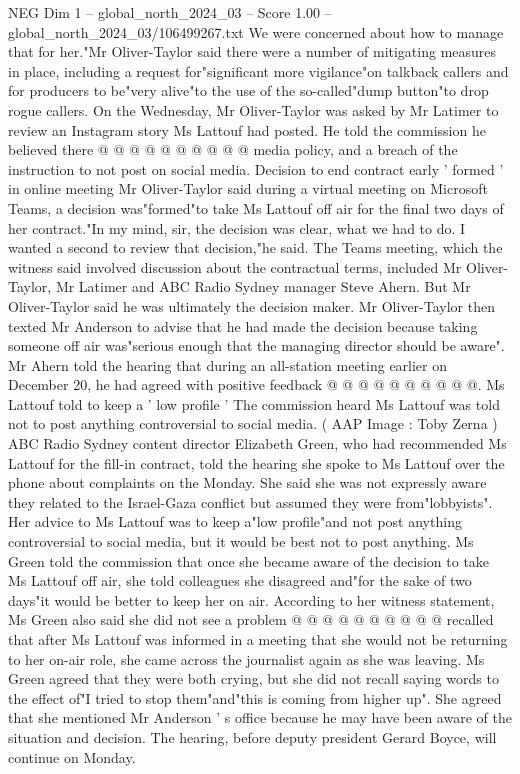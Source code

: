 \begin{textsample}{NEG Dim 1 – global\_north\_2024\_03 – Score 1.00 – global\_north\_2024\_03/106499267.txt}
We were concerned about how to manage that for her."Mr Oliver-Taylor said there were a number of mitigating measures in place, including a request for"significant more vigilance"on talkback callers and for producers to be"very alive"to the use of the so-called"dump button"to drop rogue callers.
On the Wednesday, Mr Oliver-Taylor was asked by Mr Latimer to review an Instagram story Ms Lattouf had posted.
He told the commission he believed there @ @ @ @ @ @ @ @ @ @ media policy, and a breach of the instruction to not post on social media.
Decision to end contract early ' formed ' in online meeting Mr Oliver-Taylor said during a virtual meeting on Microsoft Teams, a decision was"formed"to take Ms Lattouf off air for the final two days of her contract."In my mind, sir, the decision was clear, what we had to do.
I wanted a second to review that decision,"he said.
The Teams meeting, which the witness said involved discussion about the contractual terms, included Mr Oliver-Taylor, Mr Latimer and ABC Radio Sydney manager Steve Ahern.
But Mr Oliver-Taylor said he was ultimately the decision maker.
Mr Oliver-Taylor then texted Mr Anderson to advise that he had made the decision because taking someone off air was"serious enough that the managing director should be aware".
Mr Ahern told the hearing that during an all-station meeting earlier on December 20, he had agreed with positive feedback @ @ @ @ @ @ @ @ @ @.
Ms Lattouf told to keep a ' low profile ' The commission heard Ms Lattouf was told not to post anything controversial to social media. ( AAP Image : Toby Zerna ) ABC Radio Sydney content director Elizabeth Green, who had recommended Ms Lattouf for the fill-in contract, told the hearing she spoke to Ms Lattouf over the phone about complaints on the Monday.
She said she was not expressly aware they related to the Israel-Gaza conflict but assumed they were from"lobbyists".
Her advice to Ms Lattouf was to keep a"low profile"and not post anything controversial to social media, but it would be best not to post anything.
Ms Green told the commission that once she became aware of the decision to take Ms Lattouf off air, she told colleagues she disagreed and"for the sake of two days"it would be better to keep her on air.
According to her witness statement, Ms Green also said she did not see a problem @ @ @ @ @ @ @ @ @ @ recalled that after Ms Lattouf was informed in a meeting that she would not be returning to her on-air role, she came across the journalist again as she was leaving.
Ms Green agreed that they were both crying, but she did not recall saying words to the effect of"I tried to stop them"and"this is coming from higher up".
She agreed that she mentioned Mr Anderson ' s office because he may have been aware of the situation and decision.
The hearing, before deputy president Gerard Boyce, will continue on Monday.

\end{textsample}
